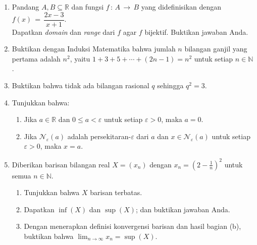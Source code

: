 \documentclass[10pt,openany,a4paper]{article}
\newcommand{\R}{\mathbb{R}}
\newcommand{\N}{\mathbb{N}}
\begin{document}
\begin{enumerate}
    \justifying
    \item Pandang $A,B\subseteq\R$ dan fungsi $f\,:\,A\,\to\,B$ yang didefinisikan dengan $f(x)\,=\,\dfrac{2x-3}{x+1}$.\\
    Dapatkan \textit{domain} dan \textit{range} dari $f$ agar $f$ bijektif. Buktikan jawaban Anda.\\

    \item Buktikan dengan Induksi Matematika bahwa jumlah $n$ bilangan ganjil yang pertama adalah $n^2$, yaitu $1+3+5+\cdots+(2n-1)=n^2$ untuk setiap $n\in\N$.\\
    
    \item Buktikan bahwa tidak ada bilangan rasional $q$ sehingga $q^2=3$.\\
    
    \item Tunjukkan bahwa:
    \begin{enumerate}
        \item Jika $a\in\R$ dan $0\leq a< \varepsilon$ untuk setiap $\varepsilon>0$, maka $a=0$.
        \item Jika $\mathcal{N}_\varepsilon(a)$ adalah persekitaran-$\varepsilon$ dari $a$ dan $x\in\mathcal{N}_\varepsilon(a)$ untuk setiap $\varepsilon>0$, maka $x=a$.\\
    \end{enumerate}

    \item Diberikan barisan bilangan real $X=(x_n)$ dengan $x_n=(2-\frac{1}{n})^2$ untuk semua $n\in\N$. 
    \begin{enumerate}
        \item Tunjukkan bahwa $X$ barisan terbatas.
        \item Dapatkan $\inf(X)$ dan $\sup(X)$; dan buktikan jawaban Anda.
        \item Dengan menerapkan definisi konvergensi barisan dan hasil bagian (b), buktikan bahwa $\lim_{n\to\infty}x_n=\sup(X)$.
    \end{enumerate}
\end{enumerate}
\end{document}

